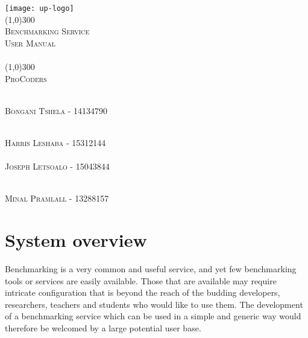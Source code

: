 \documentclass[runningheads,a4paper]{article}
\begin{document}
	
\begin{titlepage}
	\begin{center}
		\texttt{[image: up-logo]}  \\
		[1cm]
		\line(1,0){300} \\
		[0.3cm]
		\textsc{\Large
			Benchmarking Service\\
			User Manual\\
			\hfill
		}\\
		[0.1cm]
		\line(1,0){300} \\
		[0.7cm]
		\textsc{\Large
			ProCoders
		} \\
	\end{center}
	
	\begin{center}
		\begin{centre}
			\textsc{\large\\
				Bongani Tshela - 14134790\\ 
			}
		
				\textsc{\large\\
					Harris Leshaba - 15312144\\ 
				}
			\textsc{\large\\
				Joseph Letsoalo - 15043844\\ 
			}
			
			\textsc{\large\\
				Minal Pramlall - 13288157\\ 
			}
			

            

		\end{centre}
		
		
		
	\end{center}
\end{titlepage}

\begingroup

\tableofcontents
{}
\endgroup
\newpage
\section{System overview}
Benchmarking is a very common and useful service, and yet few benchmarking tools or services are easily available. Those that are available may require intricate configuration that is beyond the reach of the budding developers, researchers, teachers and students who would like to use them. The development of a benchmarking service which can be used in a simple and generic way would therefore be welcomed by a large potential user base.\newline
\end{document}
